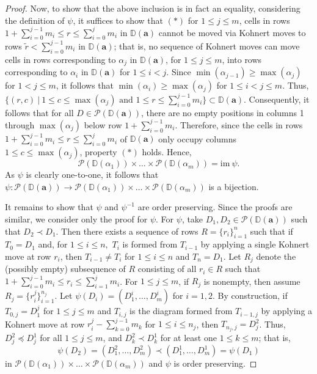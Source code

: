 \documentclass[letterpaper,10pt]{article}
\begin{document}
\begin{proof}
    Now, to show that the above inclusion is in fact an equality, considering the definition of $\psi$, it suffices to show that $(\ast)$ for $1\le j\le m$, cells in rows $1+\sum_{i=0}^{j-1}m_i\le r\le \sum_{i=0}^{j}m_i$ in $\mathbb{D}(\mathbf{a})$ cannot be moved via Kohnert moves to rows $\tilde{r}<\sum_{i=0}^{j-1}m_i$ in $\mathbb{D}(\mathbf{a})$; that is, no sequence of Kohnert moves can move cells in rows corresponding to $\alpha_j$ in $\mathbb{D}(\mathbf{a})$, for $1\le j\le m$, into rows corresponding to $\alpha_i$ in $\mathbb{D}(\mathbf{a})$ for $1\le i<j$. Since $\min(\alpha_{j-1})\ge\max(\alpha_j)$ for $1<j\le m$, it follows that $\min(\alpha_{i})\ge \max(\alpha_{j})$ for $1\le i<j\le m$. Thus, $\{(r,c)~|~1\le c\le \max(\alpha_{j})\text{ and }1\le r\le \sum_{i=0}^{j-1}m_i\}\subset\mathbb{D}(\mathbf{a})$. Consequently, it follows that for all $D\in \mathcal{P}(\mathbb{D}(\mathbf{a}))$, there are no empty positions in columns 1 through $\max(\alpha_{j})$ below row $1+\sum_{i=0}^{j-1}m_i$. Therefore, since the cells in rows $1+\sum_{i=0}^{j-1}m_i\le r\le \sum_{i=0}^{j}m_i$ of $\mathbb{D}(\mathbf{a})$ only occupy columns $1\le c\le \max(\alpha_{j})$, property $(\ast)$ holds. Hence, $$\mathcal{P}(\mathbb{D}(\alpha_1))\times\hdots\times \mathcal{P}(\mathbb{D}(\alpha_m))=\text{im}~\psi.$$ As $\psi$ is clearly one-to-one, it follows that $\psi:\mathcal{P}(\mathbb{D}(\mathbf{a}))\to\mathcal{P}(\mathbb{D}(\alpha_1))\times\hdots\times \mathcal{P}(\mathbb{D}(\alpha_m))$ is a bijection.

    It remains to show that $\psi$ and $\psi^{-1}$ are order preserving. Since the proofs are similar, we consider only the proof for $\psi$. For $\psi$, take $D_1,D_2\in \mathcal{P}(\mathbb{D}(\mathbf{a}))$ such that $D_2\prec D_1$. Then there exists a sequence of rows $R=\{r_i\}_{i=1}^n$ such that if $T_0=D_1$ and, for $1\leq i\leq n,$ $T_i$ is formed from $T_{i-1}$ by applying a single Kohnert move at row $r_i$, then $T_{i-1}\neq T_i$ for $1\le i\le n$ and $T_n=D_1$. Let $R_j$ denote the (possibly empty) subsequence of $R$ consisting of all $r_i\in R$ such that $1+\sum_{i=0}^{j-1}m_i\le r_i\le\sum_{i=1}^{j}m_i$. For $1\le j\le m$, if $R_j$ is nonempty, then assume $R_j=\{r_i^j\}_{i=1}^{n_j}$. Let $\psi(D_i)=(D^i_1,\hdots,D^i_m)$ for $i=1,2$. By construction, if $T_{0,j}=D_1^j$ for $1\le j\le m$ and $T_{i,j}$ is the diagram formed from $T_{i-1,j}$ by applying a Kohnert move at row $r_i^j-\sum_{k=0}^{j-1}m_k$ for $1\le i\le n_j$, then $T_{n_j,j}=D^2_j$. Thus, $D^2_j\preceq D^1_j$ for all $1\le j\le m$, and $D^2_k\prec D^1_k$ for at least one $1\le k\le m$; that is, $$\psi(D_2)=(D^2_1,\hdots,D^2_m)\prec (D^1_1,\hdots,D^1_m)=\psi(D_1)$$ in $\mathcal{P}(\mathbb{D}(\alpha_1))\times\hdots\times \mathcal{P}(\mathbb{D}(\alpha_m))$ and $\psi$ is order preserving.
\end{proof}
\end{document}
